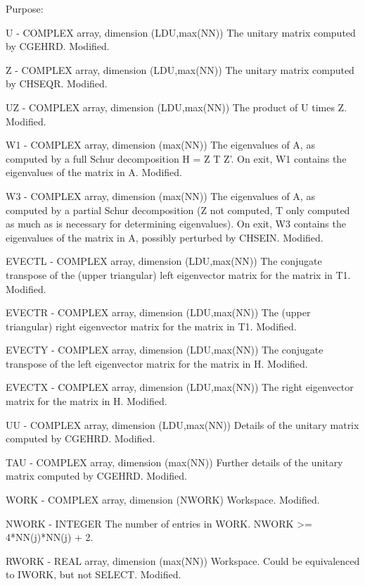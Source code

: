 \begin{DoxyParagraph}{Purpose\+: }
\begin{DoxyVerb}
  U      - COMPLEX array, dimension (LDU,max(NN))
           The unitary matrix computed by CGEHRD.
           Modified.

  Z      - COMPLEX array, dimension (LDU,max(NN))
           The unitary matrix computed by CHSEQR.
           Modified.

  UZ     - COMPLEX array, dimension (LDU,max(NN))
           The product of U times Z.
           Modified.

  W1     - COMPLEX array, dimension (max(NN))
           The eigenvalues of A, as computed by a full Schur
           decomposition H = Z T Z'.  On exit, W1 contains the
           eigenvalues of the matrix in A.
           Modified.

  W3     - COMPLEX array, dimension (max(NN))
           The eigenvalues of A, as computed by a partial Schur
           decomposition (Z not computed, T only computed as much
           as is necessary for determining eigenvalues).  On exit,
           W3 contains the eigenvalues of the matrix in A, possibly
           perturbed by CHSEIN.
           Modified.

  EVECTL - COMPLEX array, dimension (LDU,max(NN))
           The conjugate transpose of the (upper triangular) left
           eigenvector matrix for the matrix in T1.
           Modified.

  EVECTR - COMPLEX array, dimension (LDU,max(NN))
           The (upper triangular) right eigenvector matrix for the
           matrix in T1.
           Modified.

  EVECTY - COMPLEX array, dimension (LDU,max(NN))
           The conjugate transpose of the left eigenvector matrix
           for the matrix in H.
           Modified.

  EVECTX - COMPLEX array, dimension (LDU,max(NN))
           The right eigenvector matrix for the matrix in H.
           Modified.

  UU     - COMPLEX array, dimension (LDU,max(NN))
           Details of the unitary matrix computed by CGEHRD.
           Modified.

  TAU    - COMPLEX array, dimension (max(NN))
           Further details of the unitary matrix computed by CGEHRD.
           Modified.

  WORK   - COMPLEX array, dimension (NWORK)
           Workspace.
           Modified.

  NWORK  - INTEGER
           The number of entries in WORK.  NWORK >= 4*NN(j)*NN(j) + 2.

  RWORK  - REAL array, dimension (max(NN))
           Workspace.  Could be equivalenced to IWORK, but not SELECT.
           Modified.


\end{DoxyVerb}
\end{DoxyParagraph}
